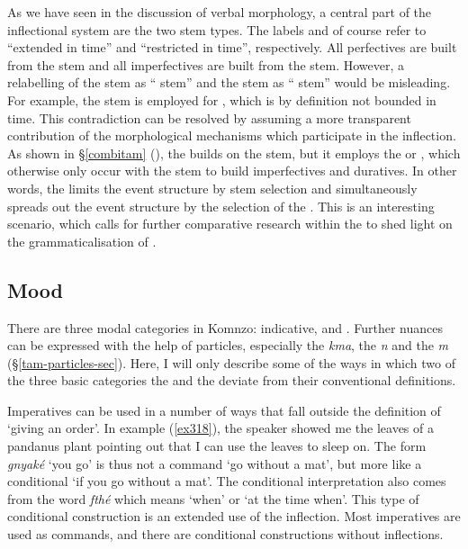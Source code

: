 As we have seen in the discussion of verbal morphology, a central part of the inflectional system are the two stem types. The labels {\Ext} and {\Rs} of course refer to ``extended in time'' and ``restricted in time'', respectively. All perfectives are built from the {\Rs} stem and all imperfectives are built from the {\Ext} stem. However, a relabelling of the {\Rs} stem as `` stem'' and the {\Ext} stem as `` stem'' would be misleading. For example, the {\Rs} stem is employed for  , which is by definition not bounded in time. This contradiction can be resolved by assuming a more transparent contribution of the morphological mechanisms which participate in the  inflection. As shown in {\S}\ref{combitam} (), the  builds on the {\Rs} stem, but it employs the \Betaone{} or \Betatwo{} , which otherwise only occur with the {\Ext} stem to build imperfectives and duratives. In other words, the   limits the event structure by stem selection and simultaneously spreads out the event structure by the selection of the . This is an interesting scenario, which calls for further comparative research within the  to shed light on the grammaticalisation of  .

\subsection{Mood}\label{TAMsemmood}

There are three modal categories in Komnzo: indicative,  and . Further nuances can be expressed with the help of particles, especially the  \emph{kma}, the  \emph{n} and the  \emph{m} ({\S}\ref{tam-particles-sec}). Here, I will only describe some of the ways in which two of the three basic categories \textendash{} the  and the  \textendash{} deviate from their conventional definitions.

Imperatives can be used in a number of ways that fall outside the definition of `giving an order'. In example (\ref{ex318}), the speaker showed me the leaves of a pandanus plant pointing out that I can use the leaves to sleep on. The  form \emph{gnyaké} `you go' is thus not a command `go without a mat', but more like a conditional `if you go without a mat'. The conditional interpretation also comes from the word \emph{fthé} which means `when' or `at the time when'. This type of conditional construction is an extended use of the  inflection. Most imperatives are used as commands, and there are conditional constructions without  inflections.

